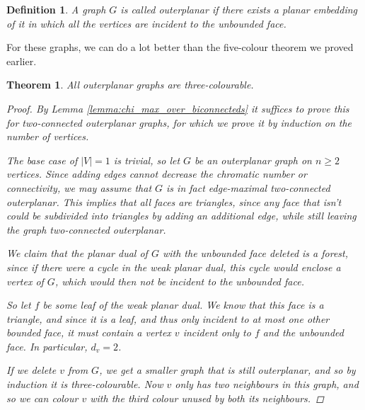 \documentclass[nobib]{tufte-handout}
\newtheorem{definition}{Definition}
\newtheorem{theorem}{Theorem}
\begin{document}
\begin{definition}
  A graph $G$ is called \emph{outerplanar} if there exists a planar embedding of it in which all the vertices are incident to the unbounded face.
\end{definition}

For these graphs, we can do a lot better than the five-colour theorem we proved earlier.

\begin{theorem}
  All outerplanar graphs are three-colourable.

  \begin{proof}
    By Lemma \ref{lemma:chi_max_over_biconnecteds} it suffices to prove this for two-connected outerplanar graphs, for which we prove it by induction on the number of vertices. 
    
    The base case of $|{V}| = 1$ is trivial, so let $G$ be an outerplanar graph on $n \geq 2$ vertices. Since adding edges cannot decrease the chromatic number or connectivity, we may assume that $G$ is in fact edge-maximal two-connected outerplanar. This implies that all faces are triangles, since any face that isn't could be subdivided into triangles by adding an additional edge, while still leaving the graph two-connected outerplanar.

    We claim that the planar dual of $G$ with the unbounded face deleted is a forest, since if there were a cycle in the weak planar dual, this cycle would enclose a vertex of $G$, which would then not be incident to the unbounded face.

    So let $f$ be some leaf of the weak planar dual. We know that this face is a triangle, and since it is a leaf, and thus only incident to at most one other bounded face, it must contain a vertex $v$ incident only to $f$ and the unbounded face. In particular, $d_v = 2$.

    If we delete $v$ from $G$, we get a smaller graph that is still outerplanar, and so by induction it is three-colourable. Now $v$ only has two neighbours in this graph, and so we can colour $v$ with the third colour unused by both its neighbours.
  \end{proof}
\end{theorem}
\end{document}
